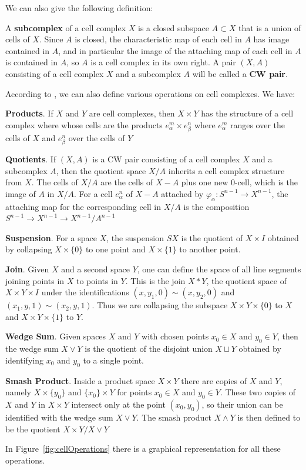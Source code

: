 We can also give the following definition:

\begin{definition}[Subcomplex]
A \textbf{subcomplex} of a cell complex $X$ is a closed subspace $A \subset X$ that is a union of cells of $X$. Since $A$ is closed, the characteristic map of each cell in $A$ has image contained in $A$, and in particular the image of the attaching map of each cell in $A$ is contained in $A$, so $A$ is a cell complex in its own right. A pair $(X,A)$ consisting of a cell complex $X$ and a subcomplex $A$ will be called a \textbf{CW pair}.
\end{definition}

According to \cite{Hatcher}, we can also define various operations on cell complexes. We have:
\begin{description}
 \item \textbf{Products}. If $X$ and $Y$ are cell complexes, then $X \times Y$ has the structure of a cell complex where whose cells are the products $e^{m}_{\alpha} \times e^{n}_{\beta}$ where $e^{m}_{\alpha}$ ranges over the cells of $X$ and $e^{n}_{\beta}$ over the cells of $Y$
 \item \textbf{Quotients}.  If $(X, A)$ is a CW pair consisting of a cell complex $X$ and a subcomplex $A$, then the quotient space $X/A$ inherits a cell complex structure from $X$. The cells of $X/A$ are the cells of $X - A$ plus one new 0-cell, which is the image of $A$ in $X/A$. For a cell $e^{n}_{\alpha}$ of $X-A$ attached by $\varphi_{\alpha} \colon S^{n-1} \rightarrow X^{n-1}$, the attaching map for the corresponding cell in $X/A$ is the composition $S^{n-1} \rightarrow X^{n-1} \rightarrow X^{n-1}/A^{n-1}$
 \item \textbf{Suspension}. For a space $X$, the suspension $SX$ is the quotient of $X \times I$ obtained by collapsing $X \times \{0\}$ to one point and $X \times \{1\}$ to another point.
 \item \textbf{Join}. Given $X$ and a second space $Y$, one can define the space of all line segments joining points in $X$ to points in $Y$. This is the join $X \ast Y$, the quotient space of $X \times Y \times I$ under the identifications $(x, y_{1}, 0) \sim (x, y_{2}, 0)$ and $(x_{1}, y, 1) \sim (x_{2}, y, 1)$. Thus we are collapsing the subspace $X \times Y \times \{0\}$ to $X$ and $X \times Y \times \{1\}$ to $Y$.
 \item \textbf{Wedge Sum}. Given spaces $X$ and $Y$ with chosen points $x_{0} \in X$ and $y_{0} \in Y$, then the wedge sum $X \vee Y$ is the quotient of the disjoint union $X \sqcup Y$ obtained by identifying $x_{0}$ and $y_{0}$ to a single point.
 \item \textbf{Smash Product}. Inside a product space $X \times Y$ there are copies of $X$ and $Y$, namely $X \times \{y_{0}\}$ and $\{x_{0}\} \times Y$ for points $x_{0} \in X$ and $y_{0} \in Y$. These two copies of $X$ and $Y$ in $X \times Y$ intersect only at the point $(x_{0}, y_{0})$, so their union can be identified with the wedge sum $X \vee Y$. The smash product $X \wedge Y$ is then defined to be the quotient $X \times Y/X \vee Y$
\end{description}
In Figure~\ref{fig:cellOperations} there is a graphical representation for all these operations.


